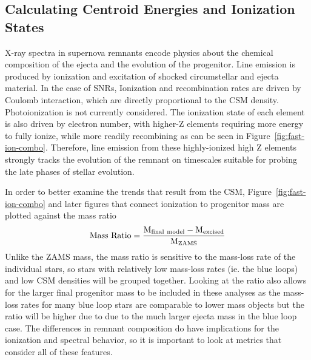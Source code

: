 \documentclass[twocolumn]{aastex631}
\begin{document}
\subsection{Calculating Centroid Energies and Ionization States}
\label{ionization}
X-ray spectra in supernova remnants encode physics about the chemical composition of the ejecta and the evolution of the progenitor. Line emission is produced by ionization and excitation of shocked circumstellar and ejecta material.  In the case of SNRs, Ionization and recombination rates are driven by Coulomb interaction, which are directly proportional to the CSM density.  Photoionization is not currently considered. The ionization state of each element is also driven by electron number, with higher-Z elements requiring more energy to fully ionize, while more readily recombining as can be seen in Figure~\ref{fig:fast-ion-combo}. Therefore, line emission from these highly-ionized high Z elements strongly tracks the evolution of the remnant on timescales suitable for probing the late phases of stellar evolution. 

In order to better examine the trends that result from the CSM, Figure~\ref{fig:fast-ion-combo} and later figures that connect ionization to progenitor mass are plotted against the mass ratio
\begin{equation}
    \rm Mass\ Ratio = \frac{\rm M_{\rm final\ model}- M_{\rm excised}}{M_{ZAMS}}
\end{equation}
Unlike the ZAMS mass, the mass ratio is sensitive to the mass-loss rate of the individual stars, so stars with relatively low mass-loss rates (ie. the blue loops) and low CSM densities will be grouped together. Looking at the ratio also allows for the larger final progenitor mass to be included in these analyses as the mass-loss rates for many blue loop stars are comparable to lower mass objects but the ratio will be higher due to due to the much larger ejecta mass in the blue loop case. The differences in remnant composition do have implications for the ionization and spectral behavior, so it is important to look at metrics that consider all of these features.
\end{document}
